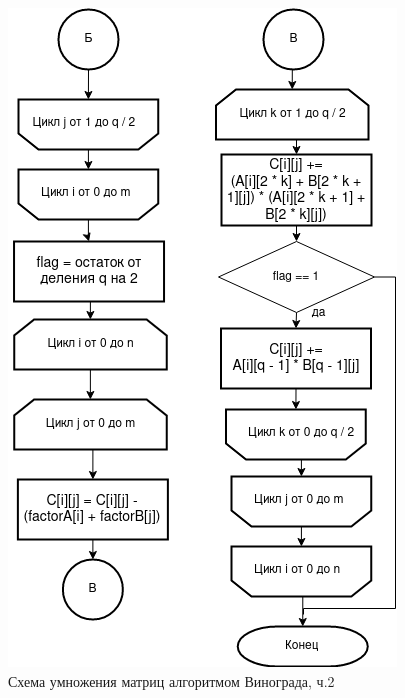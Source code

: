 \documentclass[12pt]{report}
\begin{document}
	\begin{figure}[H]
		\centering
		\includegraphics[width=0.75\linewidth]{vin_2}
		\caption{Схема умножения матриц алгоритмом Винограда, ч.2}
		\label{fig:schema_bucket_3}
	\end{figure}
	
\end{document}
